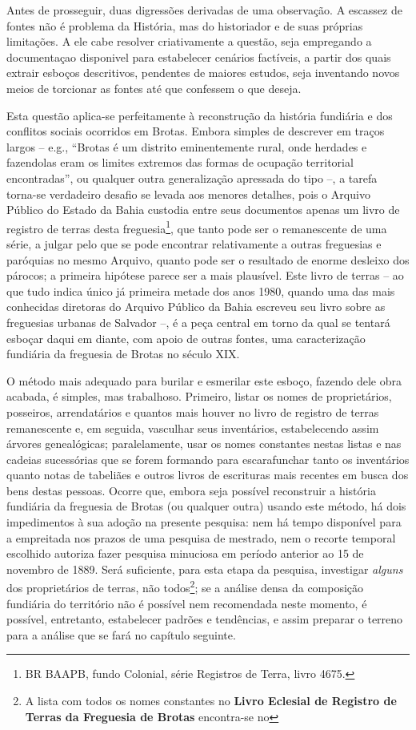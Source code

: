 Antes de prosseguir, duas digressões derivadas de uma observação. A escassez de fontes não é problema da História, mas do historiador e de suas próprias limitações. A ele cabe resolver criativamente a questão, seja empregando a documentaçao disponivel para estabelecer cenários factíveis, a partir dos quais extrair esboços descritivos, pendentes de maiores estudos, seja inventando novos meios de torcionar as fontes até que confessem o que deseja.

Esta questão aplica-se perfeitamente à reconstrução da história fundiária e dos conflitos sociais ocorridos em Brotas. Embora simples de descrever em traços largos -- e.g., ``Brotas é um distrito eminentemente rural, onde herdades e fazendolas eram os limites extremos das formas de ocupação territorial encontradas'', ou qualquer outra generalização apressada do tipo --, a tarefa torna-se verdadeiro desafio se levada aos menores detalhes, pois o Arquivo Público do Estado da Bahia custodia entre seus documentos apenas um livro de registro de terras desta freguesia\footnote{BR BAAPB, fundo Colonial, série Registros de Terra, livro 4675.}, que tanto pode ser o remanescente de uma série, a julgar pelo que se pode encontrar relativamente a outras freguesias e paróquias no mesmo Arquivo, quanto pode ser o resultado de enorme desleixo dos párocos; a primeira hipótese parece ser a mais plausível. Este livro de terras -- ao que tudo indica único já primeira metade dos anos 1980, quando uma das mais conhecidas diretoras do Arquivo Público da Bahia escreveu seu livro sobre as freguesias urbanas de Salvador \cite{NASCIMENTO2007} --, é a peça central em torno da qual se tentará esboçar daqui em diante, com apoio de outras fontes, uma caracterização fundiária da freguesia de Brotas no século XIX. 

O método mais adequado para burilar e esmerilar este esboço, fazendo dele obra acabada, é simples, mas trabalhoso. Primeiro, listar os nomes de proprietários, posseiros, arrendatários e quantos mais houver no livro de registro de terras remanescente e, em seguida, vasculhar seus inventários, estabelecendo assim árvores genealógicas; paralelamente, usar os nomes constantes nestas listas e nas cadeias sucessórias que se forem formando para escarafunchar tanto os inventários quanto notas de tabeliães e outros livros de escrituras mais recentes em busca dos bens destas pessoas. Ocorre que, embora seja possível reconstruir a história fundiária da freguesia de Brotas (ou qualquer outra) usando este método, há dois impedimentos à sua adoção na presente pesquisa: nem há tempo disponível para a empreitada nos prazos de uma pesquisa de mestrado, nem o recorte temporal escolhido autoriza fazer pesquisa minuciosa em período anterior ao 15 de novembro de 1889. Será suficiente, para esta etapa da pesquisa, investigar \textit{alguns} dos proprietários de terras, não todos\footnote{A lista com todos os nomes constantes no \textbf{Livro Eclesial de Registro de Terras da Freguesia de Brotas} encontra-se no}; se a análise densa da composição fundiária do território não é possível nem recomendada neste momento, é possível, entretanto, estabelecer padrões e tendências, e assim preparar o terreno para a análise que se fará no capítulo seguinte.

